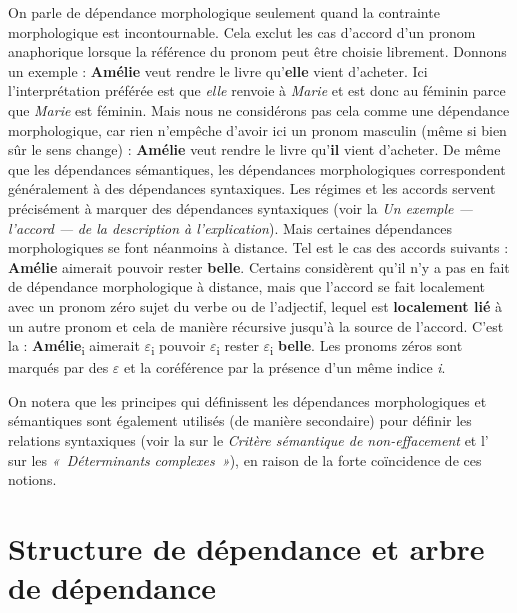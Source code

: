 {    On parle de dépendance morphologique seulement quand la contrainte morphologique est incontournable. Cela exclut les cas d’accord d’un pronom anaphorique lorsque la référence du pronom peut être choisie librement. Donnons un exemple :
    \ea
        \textbf{{Amélie}}  {veut rendre le livre qu’}\textbf{{elle}}  {vient d’acheter.}
    \z
    Ici l’interprétation préférée est que \textit{elle} renvoie à \textit{Marie} et est donc au féminin parce que \textit{Marie} est féminin. Mais nous ne considérons pas cela comme une dépendance morphologique, car rien n’empêche d’avoir ici un pronom masculin (même si bien sûr le sens change) :
    \ea
        \textbf{{Amélie}}  {veut rendre le livre qu’}\textbf{{il}}  {vient d’acheter.}
    \z
    De même que les dépendances sémantiques, les dépendances morphologiques correspondent généralement à des dépendances syntaxiques. Les régimes et les accords servent précisément à marquer des dépendances syntaxiques (voir la  \textit{Un exemple —} \textit{l’accord} \textit{—} \textit{de la description à l’explication}). Mais certaines dépendances morphologiques se font néanmoins à distance. Tel est le cas des accords suivants :
    \ea
        \textbf{{Amélie}}  {aimerait pouvoir rester} \textbf{{belle}}.
    \z
    Certains considèrent qu’il n’y a pas en fait de dépendance morphologique à distance, mais que l’accord se fait localement avec un pronom zéro sujet du verbe ou de l’adjectif, lequel est \textbf{localement lié} à un autre pronom et cela de manière récursive jusqu’à la source de l’accord. C’est la  :
    \ea
        \textbf{{Amélie}}{\textsubscript{i}}  {aimerait} \textrm{${\varepsilon}$}{\textsubscript{i}}  {pouvoir} \textrm{${\varepsilon}$}{\textsubscript{i}}  {rester} \textrm{${\varepsilon}$}{\textsubscript{i}} \textbf{{belle}}.
    \z
    Les pronoms zéros sont marqués par des \textrm{${\varepsilon}$} et la coréférence par la présence d’un même indice \textit{i}.

    On notera que les principes qui définissent les dépendances morphologiques et sémantiques sont également utilisés (de manière secondaire) pour définir les relations syntaxiques (voir la  sur le \textit{Critère sémantique de non-effacement} et l’ sur les \textit{«~Déterminants} \textit{complexes~»}), en raison de la forte coïncidence de ces notions.
}
\section{Structure de dépendance et arbre de dépendance}\label{sec:3.3.4}

